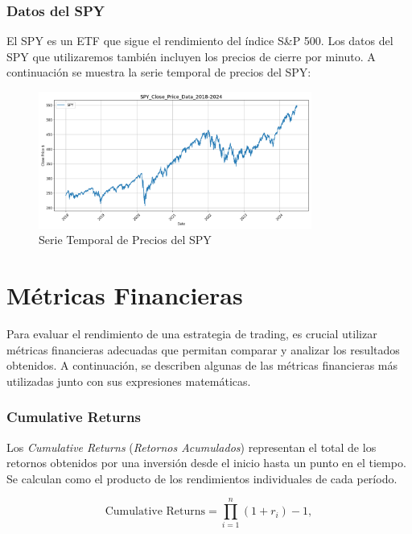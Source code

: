 \documentclass[a4paper,12pt, twoside]{report}
\begin{document}
\subsubsection{Datos del SPY}

El SPY es un ETF que sigue el rendimiento del índice S\&P 500. Los datos del SPY que utilizaremos también incluyen los precios de cierre 
por minuto. A continuación se muestra la serie temporal de precios del SPY:

\begin{figure}[H]
    \centering
    \includegraphics[width=0.8\textwidth]{figures/SPY_Close_Price_Data_2018-2024.png}
    \caption{Serie Temporal de Precios del SPY}
    \label{fig:spy-prices}
\end{figure}


\section{Métricas Financieras}

Para evaluar el rendimiento de una estrategia de trading, es crucial utilizar métricas financieras adecuadas que permitan comparar y analizar los resultados obtenidos. A continuación, se describen algunas de las métricas financieras más utilizadas junto con sus expresiones matemáticas.

\subsubsection{Cumulative Returns}

Los \textit{Cumulative Returns} (\textit{Retornos Acumulados}) representan el total de los retornos obtenidos por una inversión desde el inicio hasta un punto en el tiempo. Se calculan como el producto de los rendimientos individuales de cada período.

\begin{equation}
\text{Cumulative Returns} = \prod_{i=1}^{n} (1 + r_i) - 1,
\end{equation}
\end{document}
